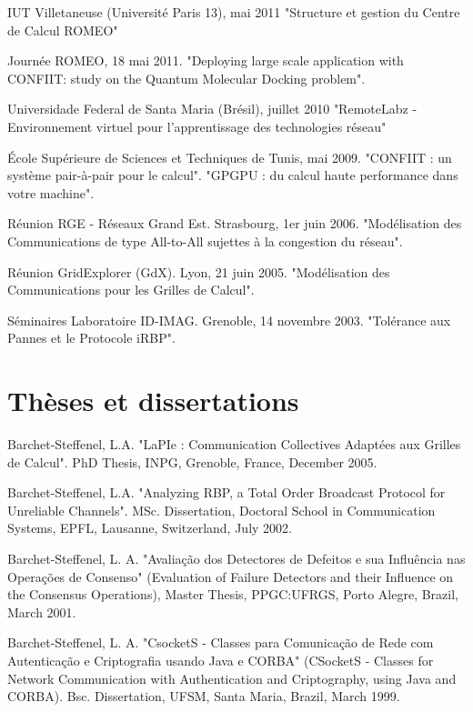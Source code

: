 \documentclass[final,twoside]{hdr} %
\begin{document}
IUT Villetaneuse (Université Paris 13), mai 2011
"Structure et gestion du Centre de Calcul ROMEO"

Journée ROMEO, 18 mai 2011.
"Deploying large scale application with CONFIIT: study on the Quantum Molecular Docking problem".

Universidade Federal de Santa Maria (Brésil), juillet 2010
"RemoteLabz - Environnement virtuel pour l’apprentissage des technologies réseau"

École Supérieure de Sciences et Techniques de Tunis, mai 2009.
"CONFIIT : un système pair-à-pair pour le calcul".
"GPGPU : du calcul haute performance dans votre machine".

Réunion RGE - Réseaux Grand Est. Strasbourg, 1er juin 2006.
"Modélisation des Communications de type All-to-All sujettes à la congestion du réseau".

Réunion GridExplorer (GdX). Lyon, 21 juin 2005.
"Modélisation des Communications pour les Grilles de Calcul".

Séminaires Laboratoire ID-IMAG. Grenoble, 14 novembre 2003.
"Tolérance aux Pannes et le Protocole iRBP".


\section*{Thèses et dissertations}

Barchet-Steffenel, L.A. "LaPIe : Communication Collectives Adaptées aux Grilles de Calcul". PhD Thesis, INPG, Grenoble, France, December 2005. 

Barchet-Steffenel, L.A. "Analyzing RBP, a Total Order Broadcast Protocol for Unreliable Channels". MSc. Dissertation, Doctoral School in Communication Systems, EPFL, Lausanne, Switzerland, July 2002.

Barchet-Steffenel, L. A. "Avaliação dos Detectores de Defeitos e sua Influência nas Operações de Consenso" (Evaluation of Failure Detectors and their Influence on the Consensus Operations), Master Thesis, PPGC:UFRGS, Porto Alegre, Brazil, March 2001.

Barchet-Steffenel, L. A. "CsocketS - Classes para Comunicação de Rede com Autenticação e Criptografia usando Java e CORBA" (CSocketS - Classes for Network Communication with Authentication and Criptography, using Java and CORBA). Bsc. Dissertation, UFSM, Santa Maria, Brazil, March 1999.

\end{document}
